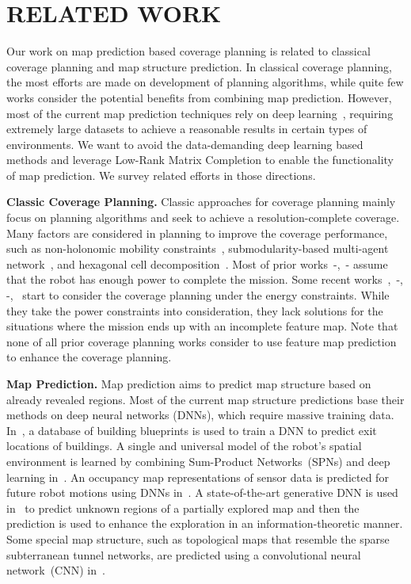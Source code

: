 \section{RELATED WORK}
Our work on map prediction based coverage planning is related to classical coverage planning and map structure prediction. In classical coverage planning, the most efforts are made on development of planning algorithms, while quite few works consider the potential benefits from combining map prediction. However, most of the current map prediction techniques rely on deep learning~\cite{caley2019deep, pronobis2017learning, katyal2018occupancy, shrestha2019learned, saroya2020online}, requiring extremely large datasets to achieve a reasonable results in certain types of environments. We want to avoid the data-demanding deep learning based methods and leverage Low-Rank Matrix Completion to enable the functionality of map prediction. We survey related efforts in those directions. 

\textbf{Classic Coverage Planning.} Classic approaches for coverage planning mainly focus on planning algorithms and seek to achieve a resolution-complete coverage. Many factors are considered in planning to improve the coverage performance, such as non-holonomic mobility constraints~\cite{kan2020online}, submodularity-based multi-agent network~\cite{sun2017submodularity}, and hexagonal cell decomposition~\cite{paull2012sensor}. Most of prior works~\cite{oh2004complete}-\cite{he2019autonomous},~\cite{kan2020online}-\cite{paull2012sensor} assume that the robot has enough power to complete the mission. Some recent works~\cite{ellefsen2017multiobjective},~\cite{di2016coverage}-\cite{cabreira2018energy}, \cite{papachristos2016distributed}-\cite{jensen2020near},~\cite{li2019coverage} start to consider the coverage planning under the energy constraints. While they take the power constraints into consideration, they lack solutions for the situations where the mission ends up with an incomplete feature map. Note that none of all prior coverage planning works consider to use feature map prediction to enhance the coverage planning.

\textbf{Map Prediction.} Map prediction aims to predict map structure based on already revealed regions. Most of the current map structure predictions base their methods on deep neural networks (DNNs), which require massive training data. In~\cite{caley2019deep}, a database of building blueprints is used to train a DNN to predict exit locations of buildings. A single and universal model of the robot's spatial environment is learned by combining Sum-Product Networks~(SPNs) and deep learning in~\cite{pronobis2017learning}. An occupancy map representations of sensor data is predicted for future robot motions using DNNs in~\cite{katyal2018occupancy}. A state-of-the-art generative DNN is used in~\cite{shrestha2019learned} to predict unknown regions of a partially explored map and then the prediction is used to enhance the exploration in an information-theoretic manner. Some special map structure, such as topological maps that resemble the sparse subterranean tunnel networks, are predicted using a convolutional neural network~(CNN) in~\cite{saroya2020online}. 

